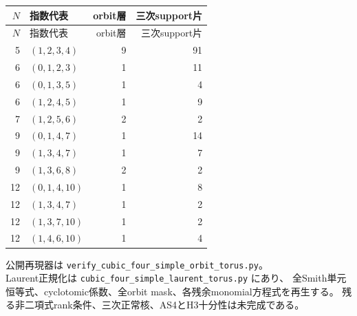 \begin{center}
\begin{longtable}{r l r r}
\toprule $N$&指数代表&orbit層&三次support片\\\midrule
\endfirsthead
\toprule $N$&指数代表&orbit層&三次support片\\\midrule
\endhead
5&$(1,2,3,4)$&9&91\\
6&$(0,1,2,3)$&1&11\\
6&$(0,1,3,5)$&1&4\\
6&$(1,2,4,5)$&1&9\\
7&$(1,2,5,6)$&2&2\\
9&$(0,1,4,7)$&1&14\\
9&$(1,3,4,7)$&1&7\\
9&$(1,3,6,8)$&2&2\\
12&$(0,1,4,10)$&1&8\\
12&$(1,3,4,7)$&1&2\\
12&$(1,3,7,10)$&1&2\\
12&$(1,4,6,10)$&1&4\\
\bottomrule
\end{longtable}
\end{center}

公開再現器は \texttt{verify\_cubic\_four\_simple\_orbit\_torus.py}。\\
Laurent正規化は \texttt{cubic\_four\_simple\_\allowbreak laurent\_torus.py} にあり、
全Smith単元恒等式、cyclotomic係数、全orbit mask、各残余monomial方程式を再生する。
残る非二項式rank条件、三次正常核、AS4とH3十分性は未完成である。
